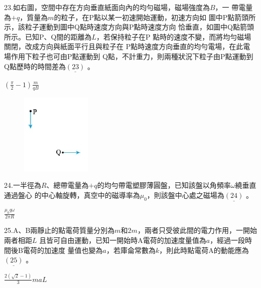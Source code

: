 \documentclass[cn,10pt,math=newtx]{elegantbook}
\begin{document}
\begin{example}
   23.如右圖，空間中存在方向垂直紙面向內的均勻磁場，磁場強度為$B$，一
帶電量為$+q$，質量為$m$的粒子，在P點以某一初速開始運動，初速方向如
圖中P點箭頭所示，該粒子運動到圖中Q點時速度方向與P點時速度方向
恰垂直，如圖中Q點箭頭所示。已知P、Q間的距離為$L$，若保持粒子在P
點時的速度不變，而將均勻磁場關閉，改成方向與紙面平行且與粒子在
P點時速度方向垂直的均勻電場，在此電場作用下粒子也可由P點運動到
Q點，不計重力，則兩種狀況下粒子由P點運動到Q點歷時的時間差為$\underline{(23)}$ 。\\
    \rightline{[文華高中教甄109]}
\end{example}
\begin{solution}
    $(\frac{\pi}{2}-1) \frac{m}{qB}$
\end{solution}
\begin{figure}[htbp]
    \flushright
    \includegraphics[width=0.3\textwidth]{image/109文華23.png}
  \end{figure}
\newpage


\begin{example}
   24.一半徑為$R$、總帶電量為$+q$的均勻帶電塑膠薄圓盤，已知該盤以角頻率$\omega$繞垂直通過盤心
的中心軸旋轉，真空中的磁導率為$\mu_0$，則該盤中心處之磁場為$\underline{(24)}$ 。\\
    \rightline{[文華高中教甄109]}
\end{example}
\begin{solution}
    $\frac{\mu_0 q \omega}{2\pi R}$
\end{solution}

\newpage


\begin{example}
   25.A、B兩靜止的點電荷質量分別為$m$和$2m$，兩者只受彼此間的電力作用，一開始兩者相距$L$
且皆可自由運動，已知一開始時A電荷的加速度量值為$a$，經過一段時間後B電荷的加速度
量值也變為$a$，若庫侖常數為$k$，則此時點電荷A的動能應為$\underline{(25)}$ 。\\
    \rightline{[文華高中教甄109]}
\end{example}
\begin{solution}
    $\frac{2(\sqrt{2}-1)}{3} maL$
\end{solution}
\end{document}

